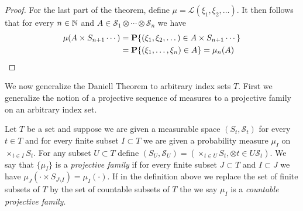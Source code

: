 \begin{proof}
For the last part of the theorem, define $\mu = \mathcal{L}(\xi_1,
\xi_2, \dotsc)$.  It then follows that for every $n \in \mathbb{N}$ and
$A \in \mathcal{S}_1 \otimes \dotsb \otimes \mathcal{S}_n$ we have
\begin{align*}
\mu(A \times S_{n+1} \dotsb) &= \textbf{P}\{(\xi_1, \xi_2, \dotsc)
  \in A \times S_{n+1} \dotsb\} \\
&=  \textbf{P}\{(\xi_1, \dotsc, \xi_n)
  \in A \} = \mu_n(A) 
\end{align*}
\end{proof}

We now generalize the Daniell Theorem to arbitrary index sets $T$.
First we generalize the notion of a projective sequence of measures to
a projective family on an arbitrary index set.
\begin{defn}Let $T$ be a set and suppose we are given a measurable
  space $(S_t, \mathcal{S}_t)$ for every $t \in T$ and for every
  finite subset $I \subset T$ we are given a probability measure
  $\mu_I$ on $\times_{t \in I} S_t$.  For any subset $U \subset T$
  define $(S_U, \mathcal{S}_U) = (\times_{t \in U} S_t , \otimes{t \in
    U} \mathcal{S}_t)$.  We say that $\lbrace \mu_I
  \rbrace$ is a \emph{projective family} if for every
  finite subset $J \subset T$ and $I \subset J$ we have $\mu_J( \cdot
  \times S_{J \setminus I}) = \mu_I( \cdot)$. If in the definition
  above we replace the set of finite subsets of $T$ by the set of
  countable subsets of $T$ the we say $\mu_I$ is a \emph{countable projective family}.
\end{defn}

